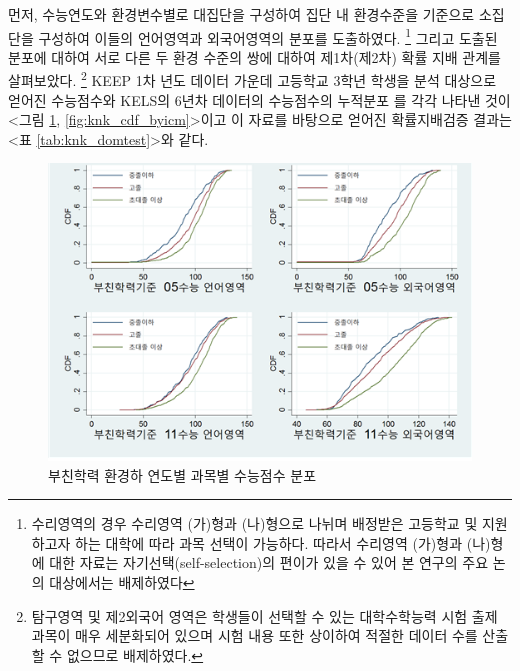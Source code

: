 먼저, 수능연도와 환경변수별로 대집단을 구성하여 집단 내 환경수준을 기준으로 소집단을 구성하여 이들의 언어영역과 외국어영역의 분포를 도출하였다.
\footnote{수리영역의 경우 수리영역 (가)형과 (나)형으로 나뉘며 배정받은 고등학교 및 지원하고자 하는 대학에 따라 과목 선택이 가능하다. 따라서 수리영역 (가)형과 (나)형에 대한 자료는 자기선택(self-selection)의 편이가 있을 수 있어 본 연구의 주요 논의 대상에서는 배제하였다}
그리고 도출된 분포에 대하여 서로 다른 두 환경 수준의 쌍에 대하여 제1차(제2차) 확률 지배 관계를 살펴보았다.
\footnote{탐구영역 및 제2외국어 영역은 학생들이 선택할 수 있는 대학수학능력 시험 출제 과목이 매우 세분화되어 있으며 시험 내용 또한 상이하여 적절한 데이터 수를 산출할 수 없으므로 배제하였다.}
KEEP 1차 년도 데이터 가운데 고등학교 3학년 학생을 분석 대상으로 얻어진 수능점수와 KELS의 6년차 데이터의 수능점수의 누적분포 를 각각 나타낸 것이 <그림 \ref{fig:knk_cdf_byedu}, \ref{fig:knk_cdf_byicm}>이고 이 자료를 바탕으로 얻어진 확률지배검증 결과는 <표 \ref{tab:knk_domtest}>와 같다.

\begin{figure}
    \centering
    \includegraphics[width=140mm]{figure/knk_cdf_byedu.png}
    \caption{부친학력 환경하 연도별 과목별 수능점수 분포}
    \label{fig:knk_cdf_byedu}
\end{figure}

